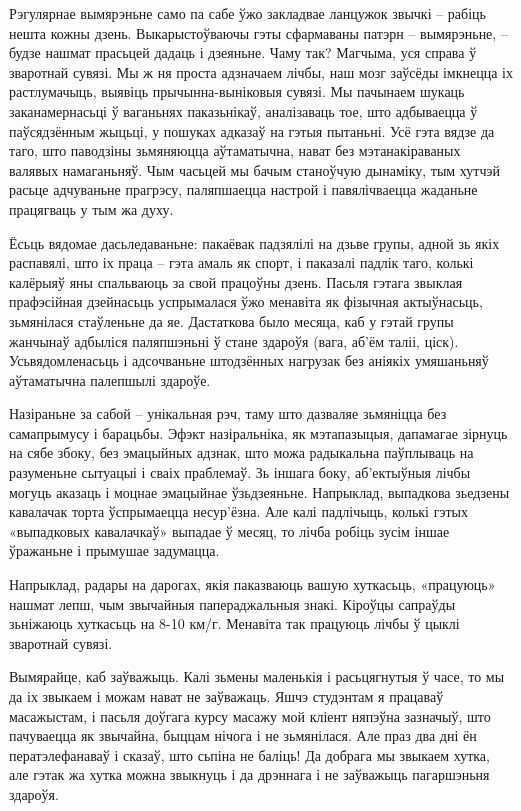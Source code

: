 Рэгулярнае вымярэньне само па сабе ўжо закладвае ланцужок звычкі – рабіць нешта кожны дзень. Выкарыстоўваючы гэты сфармаваны патэрн – вымярэньне, – будзе нашмат прасьцей дадаць і дзеяньне. Чаму так? Магчыма, уся справа ў зваротнай сувязі. Мы ж ня проста адзначаем лічбы, наш мозг заўсёды імкнецца іх растлумачыць, выявіць прычынна-выніковыя сувязі. Мы пачынаем шукаць заканамернасьці ў ваганьнях паказьнікаў, аналізаваць тое, што адбываецца ў паўсядзённым жыцьці, у пошуках адказаў на гэтыя пытаньні. Усё гэта вядзе да таго, што паводзіны зьмяняюцца аўтаматычна, нават без мэтанакіраваных валявых намаганьняў. Чым часьцей мы бачым станоўчую дынаміку, тым хутчэй расьце адчуваньне прагрэсу, паляпшаецца настрой і павялічваецца жаданьне працягваць у тым жа духу.

Ёсьць вядомае дасьледаваньне: пакаёвак падзялілі на дзьве групы, адной зь якіх распавялі, што іх праца – гэта амаль як спорт, і паказалі падлік таго, колькі калёрыяў яны спальваюць за свой працоўны дзень. Пасьля гэтага звыклая прафэсійная дзейнасьць успрымалася ўжо менавіта як фізычная актыўнасьць, зьмянілася стаўленьне да яе. Дастаткова было месяца, каб у гэтай групы жанчынаў адбыліся паляпшэньні ў стане здароўя (вага, аб'ём таліі, ціск). Усьвядомленасьць і адсочваньне штодзённых нагрузак без аніякіх умяшаньняў аўтаматычна палепшылі здароўе.

Назіраньне за сабой – унікальная рэч, таму што дазваляе зьмяніцца без самапрымусу і барацьбы. Эфэкт назіральніка, як мэтапазыцыя, дапамагае зірнуць на сябе збоку, без эмацыйных адзнак, што можа радыкальна паўплываць на разуменьне сытуацыі і сваіх праблемаў. Зь іншага боку, аб'ектыўныя лічбы могуць аказаць і моцнае эмацыйнае ўзьдзеяньне. Напрыклад, выпадкова зьедзены кавалачак торта ўспрымаецца несур'ёзна. Але калі падлічыць, колькі гэтых «выпадковых кавалачкаў» выпадае ў месяц, то лічба робіць зусім іншае ўражаньне і прымушае задумацца.

Напрыклад, радары на дарогах, якія паказваюць вашую хуткасьць, «працуюць» нашмат лепш, чым звычайныя папераджальныя знакі. Кіроўцы сапраўды зьніжаюць хуткасьць на 8-10 км/г. Менавіта так працуюць лічбы ў цыклі зваротнай сувязі.

Вымярайце, каб заўважыць. Калі зьмены маленькія і расьцягнутыя ў часе, то мы да іх звыкаем і можам нават не заўважаць. Яшчэ студэнтам я працаваў масажыстам, і пасьля доўгага курсу масажу мой кліент няпэўна зазначыў, што пачуваецца як звычайна, быццам нічога і не зьмянілася. Але праз два дні ён ператэлефанаваў і сказаў, што сьпіна не баліць! Да добрага мы звыкаем хутка, але гэтак жа хутка можна звыкнуць і да дрэннага і не заўважыць пагаршэньня здароўя.

